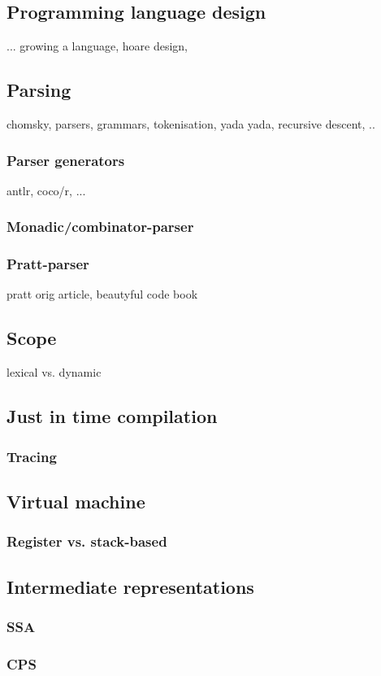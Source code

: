 \subsection{Programming language design}
... growing a language, hoare design,
\subsection{Parsing}
chomsky, parsers, grammars, tokenisation, yada yada, recursive descent, ..
\subsubsection{Parser generators}
antlr, coco/r, ...
\subsubsection{Monadic/combinator-parser}
\subsubsection{Pratt-parser}
pratt orig article, beautyful code book
\subsection{Scope}
lexical vs. dynamic
\subsection{Just in time compilation}
\subsubsection{Tracing}
\subsection{Virtual machine}
\subsubsection{Register vs. stack-based}
\subsection{Intermediate representations}
\subsubsection{SSA}
\subsubsection{CPS}
